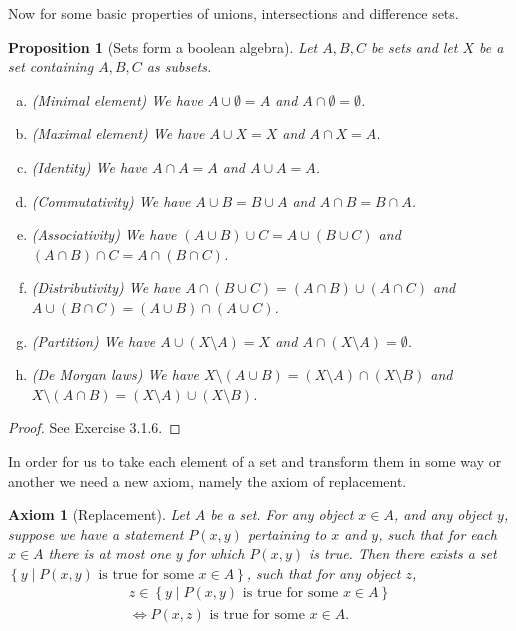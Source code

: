 \documentclass[a4paper, twocolumn]{report}
\newcounter{dummy} \numberwithin{dummy}{section}
\newcounter{axmcntr} \numberwithin{axmcntr}{chapter}
\newtheorem{axm}[axmcntr]{Axiom}
\newtheorem{prp}[dummy]{Proposition}
\theoremstyle{definition}
\theoremstyle{solution}
\newcommand{\union}{\cup}
\newcommand{\intrsct}{\cap}
\begin{document}
Now for some basic properties of unions, intersections and difference sets.
\begin{prp}[Sets form a boolean algebra]
  \label{prp_3128}
  Let $A, B, C$ be sets and let $X$ be a set containing $A, B, C$ as subsets.
  \begin{enumerate}[(a)]
    \item (Minimal element) We have $A \union \emptyset = A$ and $A \intrsct \emptyset = \emptyset$.\\
    \item (Maximal element) We have $A \union X = X $ and $A \intrsct X = A$. \\
    \item (Identity) We have $A \intrsct A = A$ and $A \union A = A$. \\
    \item (Commutativity) We have $A \union B = B \union A$ and $A \intrsct B = B \intrsct A$. \\
    \item (Associativity) We have $(A \union B) \union C = A \union (B \union C)$ and $(A \intrsct B) \intrsct C = A \intrsct (B \intrsct C)$. \\
    \item (Distributivity) We have $A \intrsct (B \union C) = (A \intrsct B) \union (A \intrsct C)$ and $A \union (B \intrsct C) = (A \union B) \intrsct (A \union C)$.\\
    \item (Partition) We have $A \union (X \setminus A) = X$ and $A \intrsct (X \setminus A) = \emptyset$. \\
    \item (De Morgan laws) We have $X \setminus (A \union B) = (X \setminus A) \intrsct (X \setminus B)$ and $X \setminus (A \intrsct B) = (X \setminus A) \union (X \setminus B)$.\\
  \end{enumerate}
\end{prp}

\begin{proof}
  See Exercise 3.1.6. 
\end{proof}
\addtocounter{dummy}{2}

In order for us to take each element of a set and transform them in some way or another we need a new axiom, namely
the axiom of replacement. 

\begin{axm}[Replacement]
  \label{axm_36} 
  Let $A$ be a set. For any object $x \in A$, and any object $y$, suppose we
  have a statement $P(x, y)$ pertaining to $x$ and $y$, such that for each $x
  \in A$ there is at most one $y$ for which $P(x, y)$ is true. Then there
  exists a set $\left\{ y \mid P(x, y) \text{ is true for some } x \in
  A\right\}$, such that for any object $z$, 
  \begin{align*}
    z \in \left\{ y \mid P(x, y) \text{ is true for some } x \in A \right\} \\
    \Longleftrightarrow P(x, z) \text { is true for some } x \in A.
  \end{align*}
\end{axm}
\end{document}
